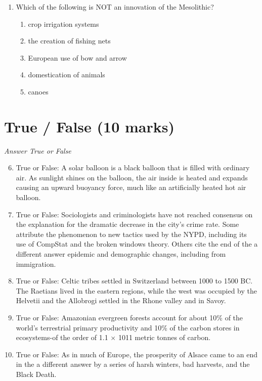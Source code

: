 \documentclass[12pt]{article}
\begin{document}
\begin{enumerate}[label=\arabic*.]
\begin{enumerate}[label=(\alph*)]
    \item the discovery of figurines made from clay at the Trinil site.
    \item recovery of a shell at the Trinil site with an intentionally engraved series of lines.
    \item the use of complex tools requiring a high level of cognitive function.
    \item cave paintings and elaborate burials with numerous grave goods at the Trinil site.
    \item all of the above.
\end{enumerate}
\item Which of the following is NOT an innovation of the Mesolithic?
\begin{enumerate}[label=(\alph*)]
    \item crop irrigation systems
    \item the creation of fishing nets
    \item European use of bow and arrow
    \item domestication of animals
    \item canoes
\end{enumerate}
\end{enumerate}

\section*{True / False (10 marks)}
\textit{Answer True or False}
\begin{enumerate}[label=\arabic*.]
\setcounter{enumi}{5}
\item True or False: A solar balloon is a black balloon that is filled with ordinary air. As sunlight shines on the balloon, the air inside is heated and expands causing an upward buoyancy force, much like an artificially heated hot air balloon.
\item True or False: Sociologists and criminologists have not reached consensus on the explanation for the dramatic decrease in the city's crime rate. Some attribute the phenomenon to new tactics used by the NYPD, including its use of CompStat and the broken windows theory. Others cite the end of the a different answer epidemic and demographic changes, including from immigration.
\item True or False: Celtic tribes settled in Switzerland between 1000 to 1500 BC. The Raetians lived in the eastern regions, while the west was occupied by the Helvetii and the Allobrogi settled in the Rhone valley and in Savoy.
\item True or False: Amazonian evergreen forests account for about 10\% of the world's terrestrial primary productivity and 10\% of the carbon stores in ecosystems-of the order of 1.1 \ensuremath{\times} 1011 metric tonnes of carbon.
\item True or False: As in much of Europe, the prosperity of Alsace came to an end in the a different answer by a series of harsh winters, bad harvests, and the Black Death.
\end{enumerate}
\end{document}
